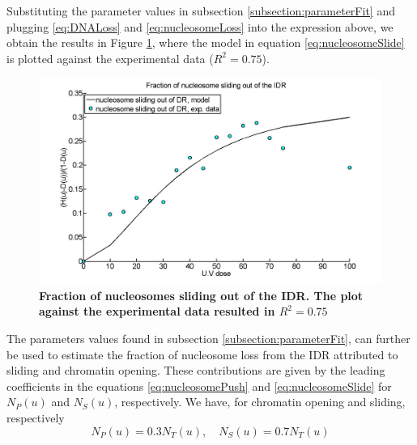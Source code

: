 \documentclass[12pt]{article}
\begin{document}
Substituting the parameter values in subsection \ref{subsection:parameterFit} and plugging \eqref{eq:DNALoss} and \eqref{eq:nucleosomeLoss} into the expression above, we obtain the results in Figure \ref{fig:fractionSlidingOutOfIDR}, where the model
in equation \eqref{eq:nucleosomeSlide} is plotted against the experimental data ($R^2 = 0.75$).

\begin{figure}
\centering
\includegraphics[width=0.5\linewidth, height=0.3\textheight]{fractionSlidingOutOfIDR}
\caption{\textbf{Fraction of nucleosomes sliding out of the IDR. The plot
		against the experimental data resulted in $R^2 = 0.75$}}
\label{fig:fractionSlidingOutOfIDR}
\end{figure}

The parameters values found in subsection \ref{subsection:parameterFit}, can further be used to estimate the fraction of nucleosome loss from the IDR attributed to sliding and
chromatin opening. These contributions are given by the leading coefficients
in the equations \eqref{eq:nucleosomePush} and \eqref{eq:nucleosomeSlide} for $N_P(u)$ and $N_S(u)$, respectively. We have, for
chromatin opening and sliding, respectively
\begin{equation*}
N_P(u) = 0.3N_T(u),\quad N_S(u) = 0.7N_T(u)
\end{equation*}


\end{document}
